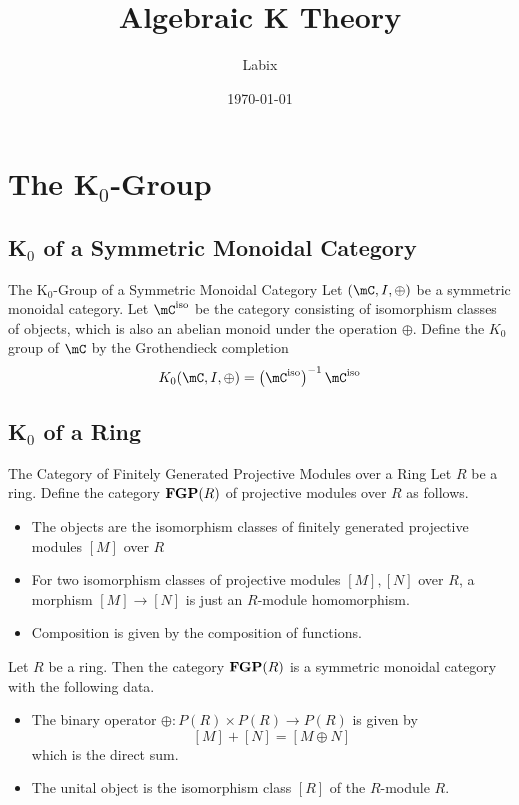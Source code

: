 \documentclass[a4paper]{article}
\title{Algebraic K Theory}
\author{Labix}
\date{\today}
\begin{document}
\maketitle
\begin{abstract}
\end{abstract}
\pagebreak
\tableofcontents

\pagebreak
\section{The K${_0}$-Group}
\subsection{K${_0}$ of a Symmetric Monoidal Category}
\begin{defn}{The K${_0}$-Group of a Symmetric Monoidal Category}{} Let $(\mC,I,\oplus)$ be a symmetric monoidal category. Let $\mC^\text{iso}$ be the category consisting of isomorphism classes of objects, which is also an abelian monoid under the operation $\oplus$. Define the $K_0$ group of $\mC$ by the Grothendieck completion $$K_0(\mC,I,\oplus)=\left(\mC^\text{iso}\right)^{-1}\mC^\text{iso}$$
\end{defn}

\subsection{K${_0}$ of a Ring}
\begin{defn}{The Category of Finitely Generated Projective Modules over a Ring}{} Let $R$ be a ring. Define the category $\bold{FGP}(R)$ of projective modules over $R$ as follows. 
\begin{itemize}
\item The objects are the isomorphism classes of finitely generated projective modules $[M]$ over $R$
\item For two isomorphism classes of projective modules $[M],[N]$ over $R$, a morphism $[M]\to [N]$ is just an $R$-module homomorphism. 
\item Composition is given by the composition of functions. 
\end{itemize}
\end{defn}

\begin{lmm}{}{} Let $R$ be a ring. Then the category $\bold{FGP}(R)$ is a symmetric monoidal category with the following data. 
\begin{itemize}
\item The binary operator $\oplus:P(R)\times P(R)\to P(R)$ is given by $$[M]+[N]=[M\oplus N]$$ which is the direct sum. 
\item The unital object is the isomorphism class $[R]$ of the $R$-module $R$. 
\end{itemize}
\end{lmm}
\end{document}
